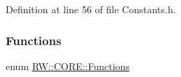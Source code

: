 Definition at line 56 of file Constants.\+h.

\hypertarget{namespace_r_w_1_1_c_o_r_e_ac0e275b436280ccfd1c33476ca8ff9c6}{}\label{namespace_r_w_1_1_c_o_r_e_ac0e275b436280ccfd1c33476ca8ff9c6} 
\subsubsection{\texorpdfstring{Functions}{Functions}\hspace{0.1cm}{\footnotesize\ttfamily [1/2]}}
{\footnotesize\ttfamily enum \hyperlink{namespace_r_w_1_1_c_o_r_e_ac0e275b436280ccfd1c33476ca8ff9c6}{R\+W\+::\+C\+O\+R\+E\+::\+Functions}\hspace{0.3cm}{\ttfamily [strong]}}


